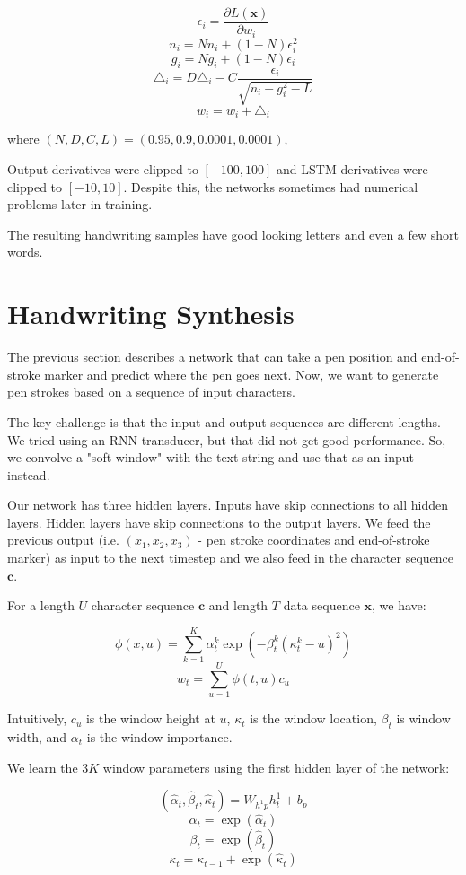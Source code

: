 \documentclass[a4paper]{article}
\begin{document}
$$
\epsilon_i = \frac{\partial L(\mathbf{x})}{\partial w_i}
$$
$$
n_i = N n_i + (1 - N) \epsilon_i^2
$$
$$
g_i = N g_i + (1 - N) \epsilon_i
$$
$$
\triangle_i = D \triangle_i - C \frac{\epsilon_i}{\sqrt{n_i - g_i^2 - L}}
$$
$$
w_i = w_i + \triangle_i
$$

where $(N, D, C, L) = (0.95, 0.9, 0.0001, 0.0001)$,

Output derivatives were clipped to $[-100, 100]$ and LSTM derivatives were
clipped to $[-10, 10]$. Despite this, the networks sometimes had numerical
problems later in training.

The resulting handwriting samples have good looking letters and even a few
short words.

\section{Handwriting Synthesis}
The previous section describes a network that can take a pen position and
end-of-stroke marker and predict where the pen goes next. Now, we want to
generate pen strokes based on a sequence of input characters.

The key challenge is that the input and output sequences are different lengths.
We tried using an RNN transducer, but that did not get good performance. So,
we convolve a "soft window" with the text string and use that as an input
instead.

Our network has three hidden layers. Inputs have skip connections to all hidden
layers. Hidden layers have skip connections to the output layers. We feed
the previous output (i.e. $(x_1, x_2, x_3)$ - pen stroke coordinates and
end-of-stroke marker) as input to the next timestep and we also feed in
the character sequence $\mathbf{c}$.

For a length $U$ character sequence $\mathbf{c}$ and length $T$ data sequence
$\mathbf{x}$, we have:

$$
\phi(x, u) = \sum_{k=1}^{K}{\alpha_t^k \exp{(-\beta_t^k (\kappa_t^k - u)^2)}}
$$
$$
w_t = \sum_{u=1}^{U}{\phi(t, u) c_u}
$$

Intuitively, $c_u$ is the window height at $u$, $\kappa_t$ is the window
location, $\beta_t$ is window width, and $\alpha_t$ is the window importance.

We learn the $3K$ window parameters using the first hidden layer of the network:

$$
(\hat{\alpha}_t, \hat{\beta}_t, \hat{\kappa}_t) = W_{h^1 p} h_t^1 + b_p
$$
$$
\alpha_t = \exp(\hat{\alpha}_t)
$$
$$
\beta_t = \exp(\hat{\beta}_t)
$$
$$
\kappa_t = \kappa_{t-1} + \exp(\hat{\kappa}_t)
$$
\end{document}
